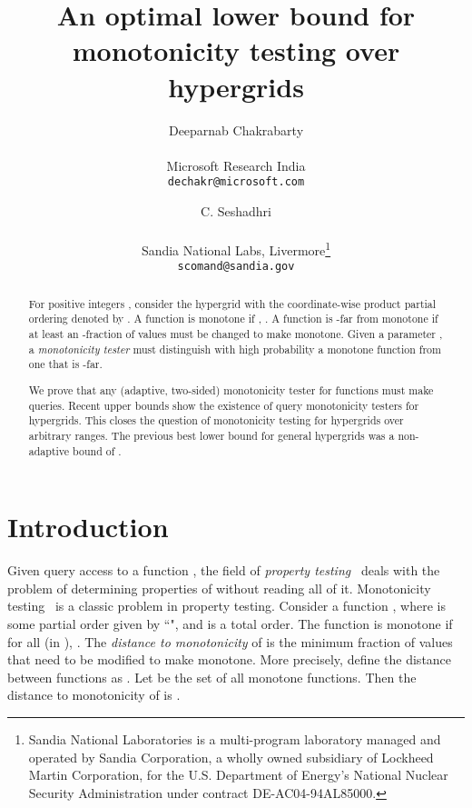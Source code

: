 \documentclass[11pt]{article}
\def\R{{\mathbb R}}
\begin{document}
\author{Deeparnab Chakrabarty
  \\\\ 
  Microsoft Research India\\
  {\tt dechakr@microsoft.com} \\
\and C. Seshadhri \\\\ 
Sandia National Labs, Livermore\thanks{Sandia National Laboratories is a multi-program laboratory managed and operated by Sandia Corporation, a wholly owned subsidiary of Lockheed Martin Corporation, for the U.S. Department of Energy's National Nuclear Security Administration under contract DE-AC04-94AL85000.} \\
{\tt scomand@sandia.gov}}


\title{An optimal lower bound for monotonicity testing over hypergrids}



\date{}
\maketitle
\def\D{{\mathbf D}}
\def\R{{\mathbf R}}

\begin{abstract} For positive integers , consider the hypergrid  with the coordinate-wise product partial ordering denoted by . 
A function  is monotone if , .
A function  is -far from monotone if at least an -fraction of values must be changed to make
 monotone. Given a parameter , a \emph{monotonicity tester} must distinguish with high probability a monotone function from one that is -far.

We prove that any (adaptive, two-sided) monotonicity tester for functions  must make
 queries. Recent upper bounds show the existence of 
query monotonicity testers for hypergrids. This closes the question of monotonicity testing for hypergrids
over arbitrary ranges. The previous best lower bound for general hypergrids was a non-adaptive bound
of . 
\end{abstract}

\section{Introduction} \label{sec:intro}

Given query access to a function , the field of \emph{property testing}~\cite{RS96,GGR98} deals
with the problem of determining properties of  without reading all of it.
Monotonicity testing~\cite{GGLRS00} is a classic problem in property testing. Consider a function ,
where  is some partial order given by ``", and  is a total order. The function  is monotone
if for all  (in ), . The \emph{distance to monotonicity} of  is the minimum
fraction of values that need to be modified to make  monotone. More precisely, define the distance between functions
 as . Let  be the set of all monotone functions.
Then the distance to monotonicity of  is .
\end{document}
